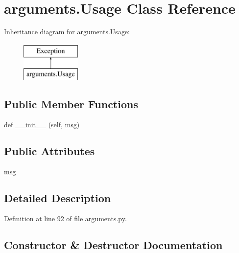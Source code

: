 \hypertarget{classarguments_1_1Usage}{}\section{arguments.\+Usage Class Reference}
\label{classarguments_1_1Usage}
Inheritance diagram for arguments.\+Usage\+:\begin{figure}[H]
\begin{center}
\leavevmode
\includegraphics[height=2.000000cm]{classarguments_1_1Usage}
\end{center}
\end{figure}
\subsection*{Public Member Functions}
\begin{DoxyCompactItemize}
\item 
def \hyperlink{classarguments_1_1Usage_a01461e8629d63db7875d33d0b30c8def}{\+\_\+\+\_\+init\+\_\+\+\_\+} (self, \hyperlink{classarguments_1_1Usage_aab69c6ee300f8e49fd5709defa9e4679}{msg})
\end{DoxyCompactItemize}
\subsection*{Public Attributes}
\begin{DoxyCompactItemize}
\item 
\hyperlink{classarguments_1_1Usage_aab69c6ee300f8e49fd5709defa9e4679}{msg}
\end{DoxyCompactItemize}


\subsection{Detailed Description}


Definition at line 92 of file arguments.\+py.



\subsection{Constructor \& Destructor Documentation}
\mbox{\label{classarguments_1_1Usage_a01461e8629d63db7875d33d0b30c8def}} 
